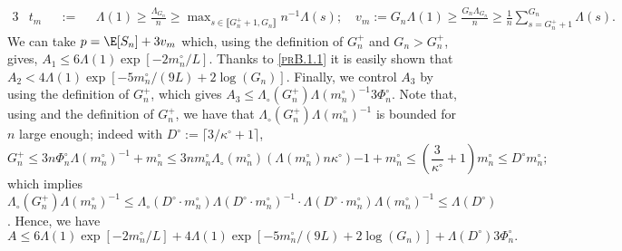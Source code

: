 \begin{alignat*}{3}
& t_{m} &&:=&& \Lambda(1) \geq \frac{\Lambda_{G_{n}}}{n} \geq \max\nolimits_{s \in \llbracket G_{n}^{+} + 1, G_{n} \rrbracket} n^{-1}\Lambda(s); \quad v_{m} := G_{n} \Lambda(1) \geq \frac{G_{n} \Lambda_{G_{n}}}{n} \geq  \frac{1}{n} \sum\nolimits_{s = G_{n}^{+} + 1}^{G_{n}} \Lambda(s).
\end{alignat*}
We can take $p = \E[S_{n}] + 3 v_{m}$ which, using the definition of $G_{n}^{+}$ and $G_{n} > G_{n}^{+}$, gives, $A_{1} \leq 6 \Lambda(1) \exp[- 2 m_{n}^{\circ}/L]$.
Thanks to \textsc{\cref{prB.1.1}} it is easily shown that $A_{2} < 4 \Lambda(1) \exp[-5 m_{n}^{\circ}/(9 L) + 2 \log (G_{n})]$.
Finally, we control $A_{3}$ by using the definition of $G_{n}^{+}$, which gives $A_{3} \leq \Lambda_{\circ}(G_{n}^{+})\Lambda(m_{n}^{\circ})^{-1} 3 \Phi_{n}^{\circ}$.
Note that, using  and the definition of $G_{n}^{+}$, we have that $\Lambda_{\circ}(G_{n}^{+})\Lambda(m_{n}^{\circ})^{-1}$ is bounded for $n$ large enough; indeed with $D^{\circ} := \lceil 3/\kappa^{\circ} + 1\rceil$,
\[G_{n}^{+} \leq 3 n \Phi_{n}^{\circ}\Lambda(m_{n}^{\circ})^{-1} + m_{n}^{\circ} \leq 3 n m_{n}^{\circ} \Lambda_{\circ}(m_{n}^{\circ})(\Lambda(m_{n}^{\circ}) n \kappa^{\circ}){-1} + m_{n}^{\circ} \leq (\frac{3}{\kappa^{\circ}} + 1) m_{n}^{\circ} \leq D^{\circ} m_{n}^{\circ};\]
which implies $\Lambda_{\circ}(G_{n}^{+})\Lambda(m_{n}^{\circ})^{-1} \leq \Lambda_{\circ}(D^{\circ} \cdot m_{n}^{\circ})\Lambda(D^{\circ} \cdot m_{n}^{\circ})^{-1} \cdot \Lambda(D^{\circ} \cdot m_{n}^{\circ})\Lambda(m_{n}^{\circ})^{-1} \leq \Lambda(D^{\circ})$.
Hence, we have
\[A \leq 6 \Lambda(1) \exp[- 2 m_{n}^{\circ}/L] + 4 \Lambda(1) \exp[-5 m_{n}^{\circ}/(9 L) + 2 \log (G_{n})] +  \Lambda(D^{\circ}) 3 \Phi_{n}^{\circ}.\]

